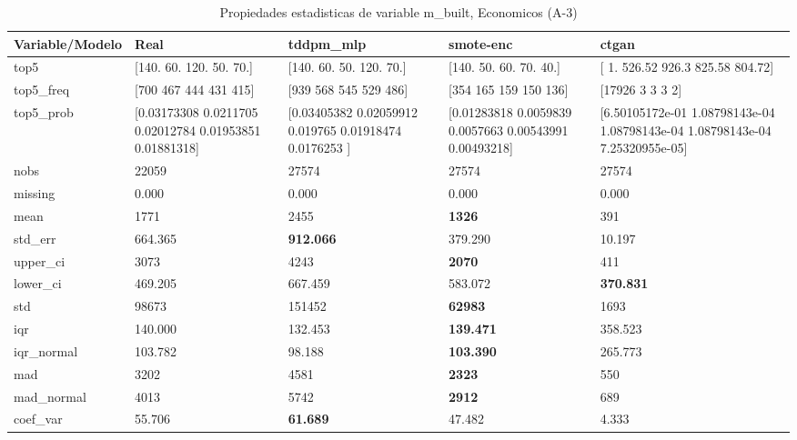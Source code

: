 \begin{table}[H]
\centering
\fontsize{8}{14}\selectfont
\caption{Propiedades  estadisticas de variable m\_built, Economicos (A-3)}
\label{table-stats-economicos-a-3-m_built}
\begin{tabular}{|l|m{10em}|m{10em}|m{10em}|m{10em}|}
\hline
 \rowcolor[gray]{0.8}
Variable/Modelo & Real & tddpm\_mlp & smote-enc & ctgan \\
\hline top5 & [140.  60. 120.  50.  70.] & [140.  60.  50. 120.  70.] & [140.  50.  60.  70.  40.] & [  1.   526.52 926.3  825.58 804.72] \\
\hline top5\_freq & [700 467 444 431 415] & [939 568 545 529 486] & [354 165 159 150 136] & [17926     3     3     3     2] \\
\hline top5\_prob & [0.03173308 0.0211705  0.02012784 0.01953851 0.01881318] & [0.03405382 0.02059912 0.019765   0.01918474 0.0176253 ] & [0.01283818 0.0059839  0.0057663  0.00543991 0.00493218] & [6.50105172e-01 1.08798143e-04 1.08798143e-04 1.08798143e-04
 7.25320955e-05] \\
\hline nobs & 22059 & 27574 & 27574 & 27574 \\
\hline missing & 0.000 & 0.000 & 0.000 & 0.000 \\
\hline mean & 1771 & 2455 & \bfseries 1326 & \cellcolor[rgb]{0.9, 0.54, 0.52} 391 \\
\hline std\_err & 664.365 & \bfseries 912.066 & 379.290 & \cellcolor[rgb]{0.9, 0.54, 0.52} 10.197 \\
\hline upper\_ci & 3073 & 4243 & \bfseries 2070 & \cellcolor[rgb]{0.9, 0.54, 0.52} 411 \\
\hline lower\_ci & 469.205 & \cellcolor[rgb]{0.9, 0.54, 0.52} 667.459 & 583.072 & \bfseries 370.831 \\
\hline std & 98673 & 151452 & \bfseries 62983 & \cellcolor[rgb]{0.9, 0.54, 0.52} 1693 \\
\hline iqr & 140.000 & 132.453 & \bfseries 139.471 & \cellcolor[rgb]{0.9, 0.54, 0.52} 358.523 \\
\hline iqr\_normal & 103.782 & 98.188 & \bfseries 103.390 & \cellcolor[rgb]{0.9, 0.54, 0.52} 265.773 \\
\hline mad & 3202 & 4581 & \bfseries 2323 & \cellcolor[rgb]{0.9, 0.54, 0.52} 550 \\
\hline mad\_normal & 4013 & 5742 & \bfseries 2912 & \cellcolor[rgb]{0.9, 0.54, 0.52} 689 \\
\hline coef\_var & 55.706 & \bfseries 61.689 & 47.482 & \cellcolor[rgb]{0.9, 0.54, 0.52} 4.333 \\

\end{tabular}
\end{table}
